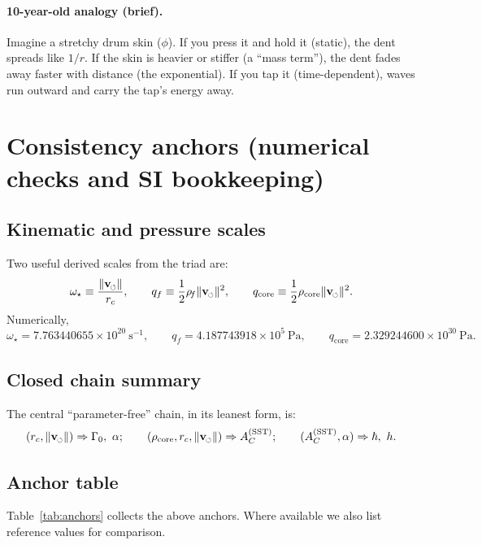 \documentclass[pdflatex,sn-mathphys-num]{revtex4-2}
\newcommand{\swirlarrow}{\mathchoice{\mkern-2mu\scriptstyle\boldsymbol{\circlearrowleft}}{\mkern-2mu\scriptstyle\boldsymbol{\circlearrowleft}}{\mkern-2mu\scriptscriptstyle\boldsymbol{\circlearrowleft}}{\mkern-2mu\scriptscriptstyle\boldsymbol{\circlearrowleft}}}
\newcommand{\rhoF}{\rho_{\!f}}   %
\newcommand{\rhocore}{\rho_{\text{core}}}
\newcommand{\vswirl}{\mathbf{v}_{\swirlarrow}}
\newcommand{\vnorm}{\lVert \vswirl \rVert}
\providecommand{\rc}{r_c}
\begin{document}
    \paragraph{10-year-old analogy (brief).}
        Imagine a stretchy drum skin (\(\phi\)). If you press it and hold it (static), the dent spreads like \(1/r\).
        If the skin is heavier or stiffer (a ``mass term''), the dent fades away faster with distance (the exponential).
        If you tap it (time-dependent), waves run outward and carry the tap's energy away.

    \section{Consistency anchors (numerical checks and SI bookkeeping)}

    \subsection{Kinematic and pressure scales}
        Two useful derived scales from the triad are:
        \begin{equation}
            \omega_\star \equiv \frac{\vnorm}{\rc},\qquad
            q_f \equiv \frac{1}{2}\rhoF\vnorm^2,\qquad
            q_{\text{core}} \equiv \frac{1}{2}\rhocore\vnorm^2.
            \label{eq:scales}
        \end{equation}
        Numerically,
        \begin{equation}
            \omega_\star = 7.763440655\times 10^{20}\ \mathrm{s^{-1}},\qquad
            q_f = 4.187743918\times 10^{5}\ \mathrm{Pa},\qquad
            q_{\text{core}} = 2.329244600\times 10^{30}\ \mathrm{Pa}.
        \end{equation}

    \subsection{Closed chain summary}
        The central ``parameter-free'' chain, in its leanest form, is:
        \begin{equation}
        (\rc,\vnorm)\Rightarrow \Gamma_0,\ \alpha;\qquad
        (\rhocore,\rc,\vnorm)\Rightarrow A_C^{\mathrm{(SST)}};\qquad
        (A_C^{\mathrm{(SST)}},\alpha)\Rightarrow \hbar,\ h.
        \end{equation}

    \subsection{Anchor table}
        Table~\ref{tab:anchors} collects the above anchors. Where available we also list reference values for comparison.
\end{document}
